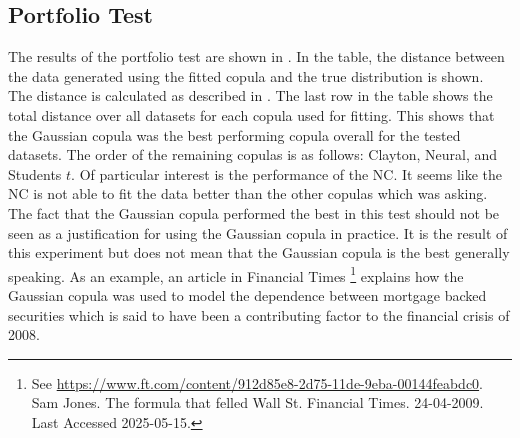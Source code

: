 \subsection{Portfolio Test}
The results of the portfolio test are shown in . In the table, the distance between the data generated using the fitted copula and the true distribution is shown. The distance is calculated as described in . The last row in the table shows the total distance over all datasets for each copula used for fitting. This shows that the Gaussian copula was the best performing copula overall for the tested datasets. The order of the remaining copulas is as follows: Clayton, Neural, and Students $t$. Of particular interest is the performance of the \gls{NC}. It seems like the \gls{NC} is not able to fit the data better than the other copulas which \RQthree was asking. The fact that the Gaussian copula performed the best in this test should not be seen as a justification for using the Gaussian copula in practice. It is the result of this experiment but does not mean that the Gaussian copula is the best generally speaking. As an example, an article in Financial Times \footnote{See \url{https://www.ft.com/content/912d85e8-2d75-11de-9eba-00144feabdc0}. Sam Jones. The formula that felled Wall St. Financial Times. 24-04-2009. Last Accessed 2025-05-15.} explains how the Gaussian copula was used to model the dependence between mortgage backed securities which is said to have been a contributing factor to the financial crisis of 2008.  

